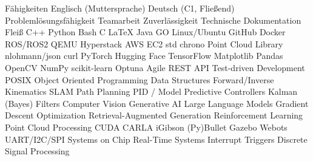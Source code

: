 
\begin{rubric}{Fähigkeiten}
\entry*[Sprachen]
	\skilldotfirst Englisch (Muttersprache) \skilldot Deutsch (C1, Fließend)
\entry*[Stärken] 
	\skilldotfirst Problemlösungsfähigkeit \skilldot Teamarbeit \skilldot Zuverlässigkeit \newline \skilldotfirst Technische Dokumentation \skilldot Fleiß %
\entry*[Coding]
	\skilldotfirst C++ \skilldot Python \skilldot Bash \skilldot C \skilldot LaTeX \skilldot Java \skilldot GO
\entry*[Software] 
	\skilldotfirst Linux/Ubuntu \skilldot GitHub \skilldot Docker \skilldot ROS/ROS2 \skilldot QEMU \newline \skilldotfirst Hyperstack \skilldot AWS EC2
 \entry*[Libraries (C++)] 
 	\skilldotfirst std \skilldot chrono \skilldot Point Cloud Library \skilldot nlohmann/json \skilldot curl
\entry*[Libraries (Py)] 
	\skilldotfirst PyTorch \skilldot Hugging Face \skilldot TensorFlow \skilldot Matplotlib \skilldot Pandas \newline \skilldot OpenCV \skilldot NumPy \skilldot scikit-learn \skilldot Optuna
\entry*[Wissen] 	
	\skilldotfirst Agile \skilldot REST API \skilldot Test-driven Development \skilldot POSIX  \newline \skilldotfirst Object Oriented Programming \skilldot Data Structures 
\entry*[Robotics]
	\skilldotfirst Forward/Inverse Kinematics \skilldot SLAM \skilldot Path Planning \newline \skilldotfirst PID / Model Predictive Controllers \skilldot Kalman (Bayes) Filters
	\skilldotfirst Computer Vision \skilldot Generative AI \skilldot Large Language Models \newline \skilldotfirst Gradient Descent Optimization \skilldot Retrieval-Augmented Generation \newline \skilldotfirst Reinforcement Learning  \skilldot Point Cloud Processing \skilldot CUDA
\entry*[Simulators] 
	\skilldotfirst CARLA \skilldot iGibson \skilldot (Py)Bullet \skilldot Gazebo \skilldot Webots
\entry*[Microcontrollers]
	\skilldotfirst UART/I2C/SPI \skilldot Systems on Chip \skilldot Real-Time Systems \newline \skilldotfirst Interrupt Triggers \skilldot Discrete Signal Processing

\end{rubric}
